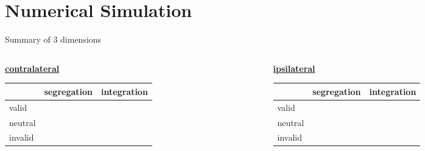 \section{Numerical Simulation}

 \frame{\sectionpage}

    \begin{frame}{Summary of 3 dimensions}

    \begin{columns}[T]

        \begin{column}{0.45\textwidth}
            \begin{center}
                \textcolor{lightlavender}{\textbf{\underline{contralateral}}}
            \end{center}
            \begin{table}[h!]
                \small
                \begin{center}
                  \begin{tabular}{l|c|c}
                    
                    & segregation & integration  \\
                    \hline
                    valid & & \\
                    \hline
                    neutral & & \\
                    \hline
                    invalid & &
                  \end{tabular}
                \end{center}
              \end{table}
            
        \end{column}

        \begin{column}{0.45\textwidth}
        \begin{center}
            \textcolor{lightlavender}{\textbf{\underline{ipsilateral}}}
        \end{center}
            \begin{table}[h!]
                \small
                \begin{center}
                  \begin{tabular}{l|c|c}
                    
                    & segregation & integration  \\
                    \hline
                    valid & & \\
                    \hline
                    neutral & & \\
                    \hline
                    invalid & &
                  \end{tabular}
                \end{center}
              \end{table}
            
        \end{column}

    \end{columns}   
        
    \end{frame}
    
